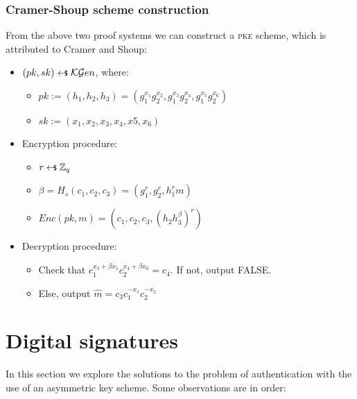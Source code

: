 
\subsubsection{Cramer-Shoup scheme construction}

From the above two proof systems we can construct a \textsc{pke} scheme, which is attributed to Cramer and Shoup:


\begin{itemize}
    \item $(pk, sk) \pickUAR \mathcal{KG}en$, where:
    \begin{itemize}
        \item $pk := (h_1, h_2, h_3) = (g_1^{x_1} g_2^{x_2}, g_1^{x_3} g_2^{x_4}, g_1^{x_5} g_2^{x_6})$
        \item $sk := (x_1, x_2, x_3, x_4, x5, x_6)$
    \end{itemize}
    \item Encryption procedure:
    \begin{itemize}
        \item $r \pickUAR \mathbb{Z}_q$
        \item $\beta = H_s(c_1, c_2, c_3) = (g_1^r, g_2^r, h_1^r m)$
        \item $Enc(pk, m) = (c_1, c_2, c_3, (h_2 h_3^\beta)^r)$
    \end{itemize}
    \item Decryption procedure:
    \begin{itemize}
        \item Check that $c_1^{x_3 + \beta x_5} c_2^{x_4 + \beta x_6} = c_4$. If not, output FALSE.
        \item Else, output $\hat{m} = c_3 c_1^{-x_1} c_2^{-x_2}$
    \end{itemize}
\end{itemize}

\section{Digital signatures}

In this section we explore the solutions to the problem of authentication with the use of an asymmetric key scheme. Some observations are in order:

